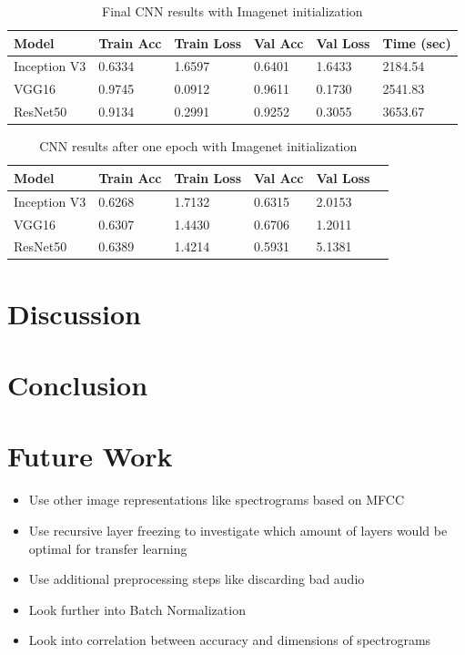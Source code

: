 \documentclass{article}
\theoremstyle{definition}
\theoremstyle{remark}
\begin{document}
\begin{table}[h!]
\center
\begin{tabular}{|l|l|l|l|l|l|}
\hline
\textbf{Model} & \textbf{Train Acc} & \textbf{Train Loss} & \textbf{Val Acc} & \textbf{Val Loss} & \textbf{Time (sec)}\\ \hline
 Inception V3	& 0.6334  & 1.6597  & 0.6401	& 1.6433 &	2184.54\\ \hline
 VGG16  		& 0.9745  	 	 & 0.0912      & 0.9611	  	  &	0.1730 	 & 2541.83\\ \hline     
 ResNet50  	& 0.9134  	  	& 0.2991  	   & 0.9252	 	  &	0.3055	 &  3653.67\\ \hline
\end{tabular}
\caption{Final CNN results with Imagenet initialization}
\label{tab:final_cnn_results_imagenet}
\end{table}

\begin{table}[h!]
\center
\begin{tabular}{|l|l|l|l|l|l|}
\hline
\textbf{Model} & \textbf{Train Acc} & \textbf{Train Loss} & \textbf{Val Acc} & \textbf{Val Loss}\\ \hline
Inception V3 & 0.6268  		 & 1.7132  	 & 0.6315	& 2.0153	\\ \hline
VGG16  		& 0.6307  	 	 & 1.4430    & 0.6706	&	1.2011 \\ \hline
ResNet50  	& 0.6389  	  	 & 1.4214  	 & 0.5931	&	5.1381\\ \hline
\end{tabular}
\caption{CNN results after one epoch with Imagenet initialization}
\label{tab:one_epoch_cnn_results_imagenet}
\end{table}



\section{Discussion}

\section{Conclusion}




\section{Future Work} \label{future_work}


\begin{itemize}
	\item Use other image representations like spectrograms based on MFCC
	\item Use recursive layer freezing to investigate which amount of layers would be optimal for transfer learning
	\item Use additional preprocessing steps like discarding bad audio
	\item Look further into Batch Normalization
	\item Look into correlation between accuracy and dimensions of spectrograms
\end{itemize}
\end{document}
